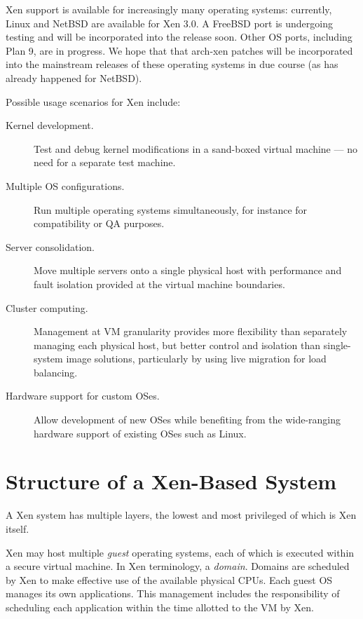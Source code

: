 Xen support is available for increasingly many operating systems:
currently, Linux and NetBSD are available for Xen 3.0. A FreeBSD port is
undergoing testing and will be incorporated into the release soon. Other
OS ports, including Plan 9, are in progress. We hope that that arch-xen
patches will be incorporated into the mainstream releases of these
operating systems in due course (as has already happened for NetBSD).


Possible usage scenarios for Xen include:

\begin{description}
\item [Kernel development.] Test and debug kernel modifications in a
  sand-boxed virtual machine --- no need for a separate test machine.
\item [Multiple OS configurations.] Run multiple operating systems
  simultaneously, for instance for compatibility or QA purposes.
\item [Server consolidation.] Move multiple servers onto a single
  physical host with performance and fault isolation provided at the
  virtual machine boundaries.
\item [Cluster computing.] Management at VM granularity provides more
  flexibility than separately managing each physical host, but better
  control and isolation than single-system image solutions,
  particularly by using live migration for load balancing.
\item [Hardware support for custom OSes.] Allow development of new
  OSes while benefiting from the wide-ranging hardware support of
  existing OSes such as Linux.
\end{description}


\section{Structure of a Xen-Based System}

A Xen system has multiple layers, the lowest and most privileged of
which is Xen itself.

Xen may host multiple \emph{guest} operating systems, each of which is
executed within a secure virtual machine. In Xen terminology, a
\emph{domain}. Domains are scheduled by Xen to make effective use of the
available physical CPUs. Each guest OS manages its own applications.
This management includes the responsibility of scheduling each
application within the time allotted to the VM by Xen.

